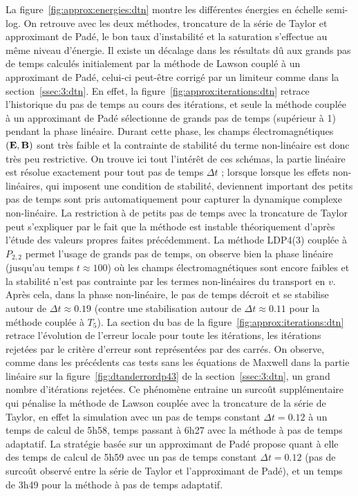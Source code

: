 La figure~\ref{fig:approx:energies:dtn} montre les différentes énergies en échelle semi-log. On retrouve avec les deux méthodes, troncature de la série de Taylor et approximant de Padé, le bon taux d'instabilité et la saturation s'effectue au même niveau d'énergie. Il existe un décalage dans les résultats dû aux grands pas de temps calculés initialement par la méthode de Lawson couplé à un approximant de Padé, celui-ci peut-être corrigé par un limiteur comme dans la section~\ref{ssec:3:dtn}. En effet, la figure~\ref{fig:approx:iterations:dtn} retrace l'historique du pas de temps au cours des itérations, et seule la méthode couplée à un approximant de Padé sélectionne de grands pas de temps (supérieur à 1) pendant la phase linéaire. Durant cette phase, les champs électromagnétiques $(\vb{E},\vb{B})$ sont très faible et la contrainte de stabilité du terme non-linéaire est donc très peu restrictive. On trouve ici tout l'intérêt de ces schémas, la partie linéaire est résolue exactement pour tout pas de temps $\Delta t$ ; lorsque lorsque les effets non-linéaires, qui imposent une condition de stabilité, deviennent important des petits pas de temps sont pris automatiquement pour capturer la dynamique complexe non-linéaire. La restriction à de petits pas de temps avec la troncature de Taylor peut s'expliquer par le fait que la méthode est instable théoriquement d'après l'étude des valeurs propres faites précédemment. La méthode LDP4(3) couplée à $P_{2,2}$ permet l'usage de grands pas de temps, on observe bien la phase linéaire (jusqu'au temps $t\approx 100$) où les champs électromagnétiques sont encore faibles et la stabilité n'est pas contrainte par les termes non-linéaires du transport en $v$. Après cela, dans la phase non-linéaire, le pas de temps décroit et se stabilise autour de $\Delta t\approx 0.19$ (contre une stabilisation autour de $\Delta t\approx 0.11$ pour la méthode couplée à $T_5$). La section du bas de la figure~\ref{fig:approx:iterations:dtn} retrace l'évolution de l'erreur locale pour toute les itérations, les itérations rejetées par le critère d'erreur sont représentées par des carrés. On observe, comme dans les précédents cas tests sans les équations de Maxwell dans la partie linéaire sur la figure~\ref{fig:dtanderrordp43} de la section~\ref{ssec:3:dtn}, un grand nombre d'itérations rejetées. Ce phénomène entraine un surcoût supplémentaire qui pénalise la méthode de Lawson couplée avec la troncature de la série de Taylor, en effet la simulation avec un pas de temps constant $\Delta t=0.12$ à un temps de calcul de 5h58, temps passant à 6h27 avec la méthode à pas de temps adaptatif. La stratégie basée sur un approximant de Padé propose quant à elle des temps de calcul de 5h59 avec un pas de temps constant $\Delta t=0.12$ (pas de surcoût observé entre la série de Taylor et l'approximant de Padé), et un temps de 3h49 pour la méthode à pas de temps adaptatif.


